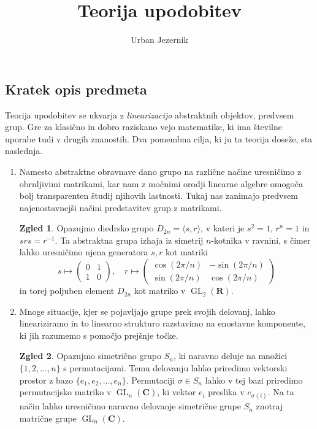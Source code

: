 \documentclass[11pt]{book}
\title{\bf Teorija upodobitev}
\author{Urban Jezernik}
\def\RR{\mathbf{R}}
\def\CC{\mathbf{C}}
\DeclareMathOperator\GL{GL}
\theoremstyle{definition}
\theoremstyle{zgled}
\newtheorem*{zgled}{Zgled}
\theoremstyle{odprtproblem}
\theoremstyle{domacanaloga}
\theoremstyle{izrek}
\begin{document}
\baselineskip=14pt

\maketitle

\setcounter{tocdepth}{1}
\tableofcontents

\newpage

\subsection*{Kratek opis predmeta}


Teorija upodobitev se ukvarja z \emph{linearizacijo} abstraktnih objektov, predvsem grup. Gre za klasično in dobro raziskano vejo matematike, ki ima številne uporabe tudi v drugih znanostih. Dva pomembna cilja, ki ju ta teorija doseže, sta naslednja. 

\begin{enumerate}
    \item Namesto abstraktne obravnave dano grupo na različne načine uresničimo z obrnljivimi matrikami, kar nam z močnimi orodji linearne algebre omogoča bolj transparenten študij njihovih lastnosti. Tukaj nas zanimajo predvsem najenostavnejši načini predstavitev grup z matrikami.
    
    \begin{zgled}
        Opazujmo diedrsko grupo $D_{2n} = \langle s, r \rangle$, v kateri je $s^2 = 1$, $r^n = 1$ in $s r s = r^{-1}$. Ta abstraktna grupa izhaja iz simetrij $n$-kotnika v ravnini, s čimer lahko uresničimo njena generatora $s,r$ kot matriki
        \[
            s \mapsto \begin{pmatrix}
                0 & 1 \\ 1 & 0
            \end{pmatrix}, \quad
            r \mapsto \begin{pmatrix}
                \cos(2 \pi/n) & - \sin(2 \pi/n) \\
                \sin(2 \pi/n) & \cos(2 \pi/n)
            \end{pmatrix}
        \]
        in torej poljuben element $D_{2n}$ kot matriko v $\GL_2(\RR)$.
    \end{zgled}

    \item Mnoge situacije, kjer se pojavljajo grupe prek svojih delovanj, lahko lineariziramo in to linearno strukturo razstavimo na enostavne komponente, ki jih razumemo s pomočjo prejšnje točke.
    
    \begin{zgled}
        Opazujmo simetrično grupo $S_n$, ki naravno deluje na množici $\{ 1, 2, \dots, n \}$ s permutacijami. Temu delovanju lahko priredimo vektorski prostor z bazo $\{ e_1, e_2, \dots, e_n \}$. Permutaciji $\sigma \in S_n$ lahko v tej bazi priredimo permutacijsko matriko v $\GL_n(\CC)$, ki vektor $e_i$ preslika v $e_{\sigma(i)}$. Na ta način lahko uresničimo naravno delovanje simetrične grupe $S_n$ znotraj matrične grupe $\GL_n(\CC)$.
    \end{zgled}
\end{enumerate}
\end{document}
